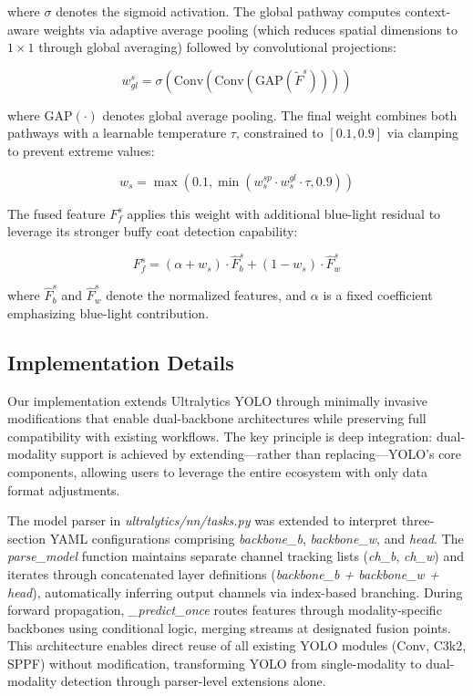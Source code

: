 \documentclass[journal,twoside,web]{ieeecolor}
\begin{document}
where $\sigma$ denotes the sigmoid activation. The global pathway computes context-aware weights via adaptive average pooling (which reduces spatial dimensions to $1 \times 1$ through global averaging) followed by convolutional projections:

\begin{equation}
w^s_{gl} = \sigma(\text{Conv}(\text{Conv}(\text{GAP}(\tilde{F}^s))))
\end{equation}

where $\text{GAP}(\cdot)$ denotes global average pooling. The final weight combines both pathways with a learnable temperature $\tau$, constrained to $[0.1, 0.9]$ via clamping to prevent extreme values:

\begin{equation}
w_s = \max(0.1, \min(w_s^{sp} \cdot w_s^{gl} \cdot \tau, 0.9))
\end{equation}

The fused feature $F_{f}^s$ applies this weight with additional blue-light residual to leverage its stronger buffy coat detection capability:

\begin{equation}
F_{f}^s = (\alpha + w_s) \cdot \hat{F}_b^s + (1 - w_s) \cdot \hat{F}_w^s
\end{equation}

where $\hat{F}_b^s$ and $\hat{F}_w^s$ denote the normalized features, and $\alpha$ is a fixed coefficient emphasizing blue-light contribution.

\subsection{Implementation Details}

Our implementation extends Ultralytics YOLO through minimally invasive modifications that enable dual-backbone architectures while preserving full compatibility with existing workflows. The key principle is deep integration: dual-modality support is achieved by extending—rather than replacing—YOLO's core components, allowing users to leverage the entire ecosystem with only data format adjustments.

The model parser in \textit{ultralytics/nn/tasks.py} was extended to interpret three-section YAML configurations comprising \textit{backbone\_b}, \textit{backbone\_w}, and \textit{head}. The \textit{parse\_model} function maintains separate channel tracking lists (\textit{ch\_b}, \textit{ch\_w}) and iterates through concatenated layer definitions (\textit{backbone\_b + backbone\_w + head}), automatically inferring output channels via index-based branching. During forward propagation, \textit{\_predict\_once} routes features through modality-specific backbones using conditional logic, merging streams at designated fusion points. This architecture enables direct reuse of all existing YOLO modules (Conv, C3k2, SPPF) without modification, transforming YOLO from single-modality to dual-modality detection through parser-level extensions alone.
\end{document}
